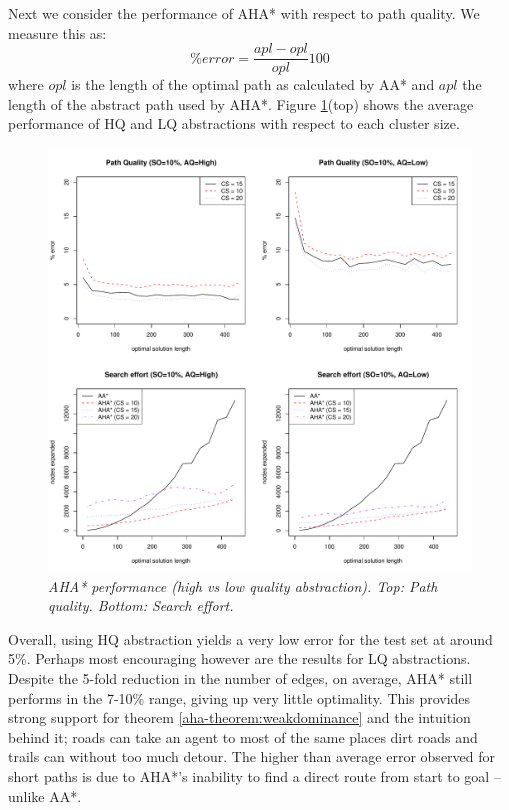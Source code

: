 Next we consider the performance of AHA* with respect to path quality. We measure this as:
$$ \%error = \frac{apl - opl}{opl}100 $$ where $opl$ is the length of the optimal path as calculated by AA* and $apl$ the length of the abstract path used by AHA*.
Figure \ref{aha-fig:allgraphs}(top) shows the average performance of HQ and LQ abstractions with respect to each cluster size. 
\begin{figure}[htbp]
       \caption{\emph{AHA* performance (high vs low quality abstraction). Top: Path quality. Bottom: Search effort. }}
       \begin{center}
                       \includegraphics[scale=0.35]{diagrams/allgraphs.pdf}
       \end{center}
       \label{aha-fig:allgraphs}
\end{figure}
Overall, using HQ abstraction yields a very low error for the test set at around 5\%. 
Perhaps most encouraging however are the results for LQ abstractions. 
Despite the 5-fold reduction in the number of edges, on average, AHA* still performs in the 7-10\% range, giving up very little optimality. 
This provides strong support for theorem \ref{aha-theorem:weakdominance} and the intuition behind it; roads can take an agent to most of the same places dirt roads and trails can without too much detour.
The higher than average error observed for short paths is due to AHA*'s inability to find a direct route from start to goal -- unlike AA*.
